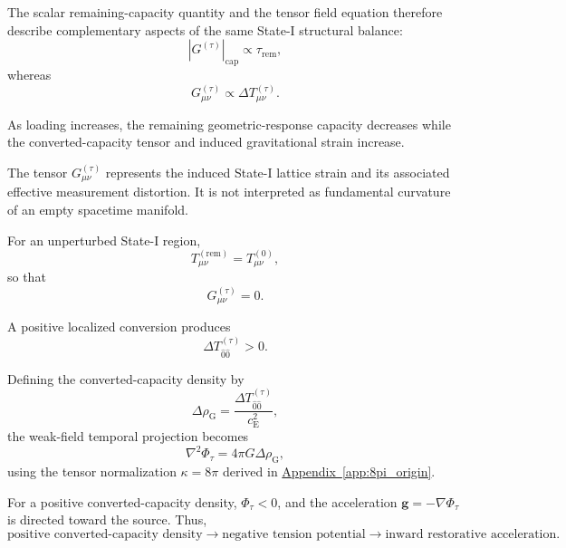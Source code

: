 The scalar remaining-capacity quantity and the tensor field equation therefore describe complementary aspects of the same State-I structural balance:
\begin{equation}
    |G^{(\tau)}|_{\mathrm{cap}} \propto \tau_{\mathrm{rem}},
\end{equation}
whereas
\begin{equation}
    G_{\mu\nu}^{(\tau)} \propto \Delta T_{\mu\nu}^{(\tau)}.
\end{equation}

As loading increases, the remaining geometric-response capacity decreases while the converted-capacity tensor and induced gravitational strain increase.

The tensor $G_{\mu\nu}^{(\tau)}$ represents the induced State-I lattice strain and its associated effective measurement distortion. It is not interpreted as fundamental curvature of an empty spacetime manifold.

For an unperturbed State-I region,
\begin{equation}
    T_{\mu\nu}^{(\mathrm{rem})} = T_{\mu\nu}^{(0)},
\end{equation}
so that
\begin{equation}
    G_{\mu\nu}^{(\tau)} = 0.
\end{equation}

A positive localized conversion produces
\begin{equation}
    \Delta T_{\hat{0}\hat{0}}^{(\tau)} > 0.
\end{equation}

Defining the converted-capacity density by
\begin{equation}
    \Delta\rho_{\mathrm{G}} = \frac{ \Delta T_{\hat{0}\hat{0}}^{(\tau)} }{ c_{\mathrm{E}}^2 },
\end{equation}
the weak-field temporal projection becomes
\begin{equation}
    \nabla^2\Phi_{\tau} = 4\pi G\Delta\rho_{\mathrm{G}},
\end{equation}
using the tensor normalization $\kappa=8\pi$ derived in \hyperref[app:8pi_origin]{Appendix~\ref*{app:8pi_origin}}.

For a positive converted-capacity density, $\Phi_{\tau}<0$, and the acceleration $\mathbf{g} = -\nabla\Phi_{\tau}$ is directed toward the source. Thus,
\begin{equation}
    \text{positive converted-capacity density} \longrightarrow \text{negative tension potential} \longrightarrow \text{inward restorative acceleration}.
\end{equation}

